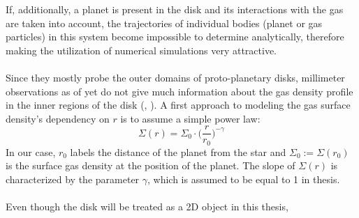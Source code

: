     If, additionally, a planet is present in the disk 
    and its interactions with the gas are taken into account, the trajectories 
    of individual bodies (planet or gas particles) in this system become 
    impossible to determine analytically, therefore making the utilization
    of numerical simulations very attractive.
    \\ %
    \\
    Since they mostly probe the outer domains of proto-planetary 
    disks, millimeter observations as of yet do not give much information about 
    the gas density profile in the inner regions of the disk
    (\citeauthor{Dullemond_2010}, \citeyear{Dullemond_2010}). 
    A first approach to modeling the gas
    surface density's dependency on $r$ is to assume a simple power law:
    \begin{equation}
      \Sigma(r)=\Sigma_0\cdot\bigg(\frac{r}{r_0}\bigg)^{-\gamma}
      \label{eq:surface_density_as_fct_of_r}
    \end{equation}
    In our case, $r_0$ labels the distance of the planet from the star and 
    $\Sigma_0:=\Sigma(r_0)$ is the surface gas density at the position of the 
    planet. The slope of $\Sigma(r)$ is characterized by the parameter $\gamma$, 
    which is assumed to be equal to 1 in thesis.
    \\
    \\
    Even though the disk will be treated as a 2D object in this thesis,
